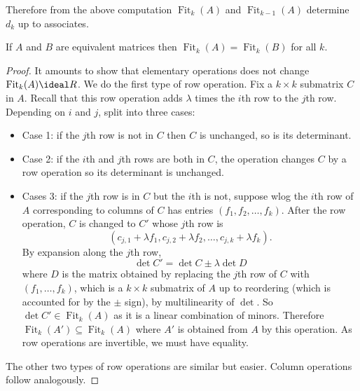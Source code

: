 \documentclass[a4paper]{article}
\theoremstyle{definition}
\DeclareMathOperator{\fit}{Fit}
\begin{document}
Therefore from the above computation \(\fit_k(A)\) and \(\fit_{k - 1}(A)\) determine \(d_k\) up to associates.

\begin{lemma}
  If \(A\) and \(B\) are equivalent matrices then \(\fit_k(A) = \fit_k(B)\) for all \(k\).
\end{lemma}

\begin{proof}
  It amounts to show that elementary operations does not change \(\fit_k(A) \ideal R\). We do the first type of row operation. Fix a \(k \times k\) submatrix \(C\) in \(A\). Recall that this row operation adds \(\lambda\) times the \(i\)th row to the \(j\)th row. Depending on \(i\) and \(j\), split into three cases:
  \begin{itemize}
  \item Case 1: if the \(j\)th row is not in \(C\) then \(C\) is unchanged, so is its determinant.
  \item Case 2: if the \(i\)th and \(j\)th rows are both in \(C\), the operation changes \(C\) by a row operation so its determinant is unchanged.
  \item Cases 3: if the \(j\)th row is in \(C\) but the \(i\)th is not, suppose wlog the \(i\)th row of \(A\) corresponding to columns of \(C\) has entries \((f_1, f_2, \dots, f_k)\). After the row operation, \(C\) is changed to \(C'\) whose \(j\)th row is
    \[
      (c_{j, 1} + \lambda f_1, c_{j, 2} + \lambda f_2, \dots, c_{j, k} + \lambda f_k).
    \]
    By expansion along the \(j\)th row,
    \[
      \det C' = \det C \pm \lambda \det D
    \]
    where \(D\) is the matrix obtained by replacing the \(j\)th row of \(C\) with \((f_1, \dots, f_k)\), which is a \(k \times k\) submatrix of \(A\) up to reordering (which is accounted for by the \(\pm\) sign), by multilinearity of \(\det\). So \(\det C' \in \fit_k(A)\) as it is a linear combination of minors. Therefore \(\fit_k(A') \subseteq \fit_k(A)\) where \(A'\) is obtained from \(A\) by this operation. As row operations are invertible, we must have equality.
  \end{itemize}

  The other two types of row operations are similar but easier. Column operations follow analogously.
\end{proof}
\end{document}
